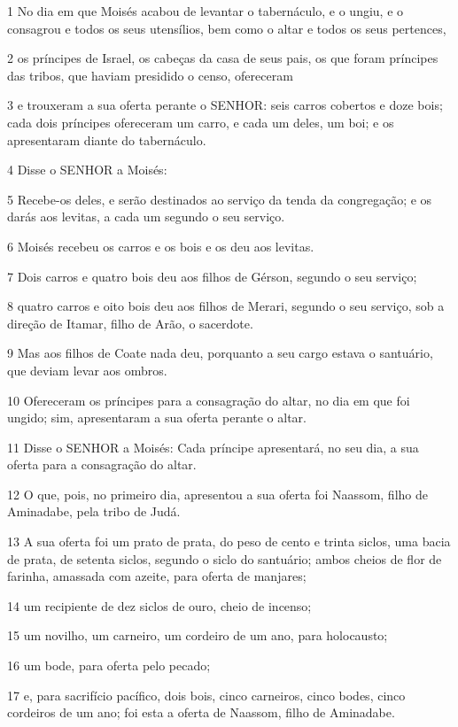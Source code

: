 \par 1 No dia em que Moisés acabou de levantar o tabernáculo, e o ungiu, e o consagrou e todos os seus utensílios, bem como o altar e todos os seus pertences,
\par 2 os príncipes de Israel, os cabeças da casa de seus pais, os que foram príncipes das tribos, que haviam presidido o censo, ofereceram
\par 3 e trouxeram a sua oferta perante o SENHOR: seis carros cobertos e doze bois; cada dois príncipes ofereceram um carro, e cada um deles, um boi; e os apresentaram diante do tabernáculo.
\par 4 Disse o SENHOR a Moisés:
\par 5 Recebe-os deles, e serão destinados ao serviço da tenda da congregação; e os darás aos levitas, a cada um segundo o seu serviço.
\par 6 Moisés recebeu os carros e os bois e os deu aos levitas.
\par 7 Dois carros e quatro bois deu aos filhos de Gérson, segundo o seu serviço;
\par 8 quatro carros e oito bois deu aos filhos de Merari, segundo o seu serviço, sob a direção de Itamar, filho de Arão, o sacerdote.
\par 9 Mas aos filhos de Coate nada deu, porquanto a seu cargo estava o santuário, que deviam levar aos ombros.
\par 10 Ofereceram os príncipes para a consagração do altar, no dia em que foi ungido; sim, apresentaram a sua oferta perante o altar.
\par 11 Disse o SENHOR a Moisés: Cada príncipe apresentará, no seu dia, a sua oferta para a consagração do altar.
\par 12 O que, pois, no primeiro dia, apresentou a sua oferta foi Naassom, filho de Aminadabe, pela tribo de Judá.
\par 13 A sua oferta foi um prato de prata, do peso de cento e trinta siclos, uma bacia de prata, de setenta siclos, segundo o siclo do santuário; ambos cheios de flor de farinha, amassada com azeite, para oferta de manjares;
\par 14 um recipiente de dez siclos de ouro, cheio de incenso;
\par 15 um novilho, um carneiro, um cordeiro de um ano, para holocausto;
\par 16 um bode, para oferta pelo pecado;
\par 17 e, para sacrifício pacífico, dois bois, cinco carneiros, cinco bodes, cinco cordeiros de um ano; foi esta a oferta de Naassom, filho de Aminadabe.
